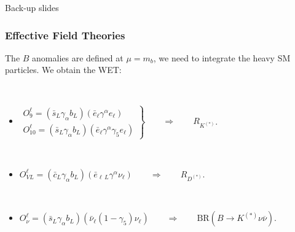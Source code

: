 \documentclass[mathserif, 10pt]{beamer}
\begin{document}
\begin{frame}
    \vspace{5cm}
    Back-up slides
\end{frame}

\begin{frame}

    \frametitle{Effective Field Theories}
    The $B$ anomalies are defined at $\mu=m_b$, we need to integrate the heavy SM particles. We obtain the WET\@:

    ~

    \begin{itemize}
        \item $\left.\begin{matrix}
                      O_9^\ell = (\bar{s}_L \gamma_\alpha b_L)(\bar{e}_\ell \gamma^\alpha e_\ell) \\
                      O_{10}^\ell = (\bar{s}_L \gamma_\alpha b_L)(\bar{e}_\ell \gamma^\alpha \gamma_5 e_\ell)
                  \end{matrix}\right\} \qquad \Longrightarrow \qquad R_{K^{(*)}}$. %

              ~

        \item $O_{VL}^\ell = (\bar{c}_L \gamma_\alpha b_L)(\bar{e}_{\ell\,L} \gamma^\alpha \nu_\ell) \qquad\Longrightarrow\qquad R_{D^{(*)}}$.

              ~

        \item $O_\nu^\ell = (\bar{s}_L \gamma_\alpha b_L)(\bar{\nu}_\ell (1-\gamma_5) \nu_\ell) \qquad\Longrightarrow \qquad \mathrm{BR}(B\to K^{(*)}\nu\overline{\nu})$.
    \end{itemize}



\end{frame}
\end{document}

